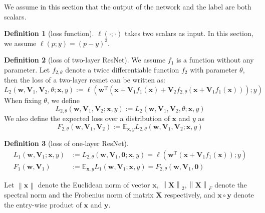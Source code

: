 \documentclass{article}
\theoremstyle{plain}
\theoremstyle{definition}
\newtheorem{defn}{Definition}
\newcommand{\norm}[1]{\left\lVert#1\right\rVert}
\begin{document}
We assume in this section that the output of the network and the label are both scalars.

\begin{defn}[loss function]
    $\ell(\cdot;\cdot)$ takes two scalars as input. In this section, we assume $\ell(p;y)=(p-y)^2$.
\end{defn}

\begin{defn}[loss of two-layer ResNet]
    We assume $f_1$ is a function without any parameter. Let $f_{2,\theta}$ denote a twice differentiable function $f_2$ with parameter $\theta$, then the loss of a two-layer resnet can be written as:
    \[L_2(\mathbf{w},\mathbf{V}_1,\mathbf{V}_2,\theta;\mathbf{x},y):=\ell\left(\mathbf{w}^\mathrm{T}(\mathbf{x}+\mathbf{V}_1f_1(\mathbf{x})+\mathbf{V}_2f_{2,\theta}(\mathbf{x}+\mathbf{V}_1f_1(\mathbf{x})));y\right)\]
    When fixing $\theta$, we define
    \[L_{2,\theta}(\mathbf{w},\mathbf{V}_1,\mathbf{V}_2;\mathbf{x},y):=L_2(\mathbf{w},\mathbf{V}_1,\mathbf{V}_2,\theta;\mathbf{x},y)\]
    We also define the expected loss over a distribution of $\mathbf{x}$ and $y$ as
    \[F_{2,\theta}(\mathbf{w},\mathbf{V}_1,\mathbf{V}_2):=\mathbb{E}_{\mathbf{x},y}L_{2,\theta}(\mathbf{w},\mathbf{V}_1,\mathbf{V}_2;\mathbf{x},y)\]
\end{defn}

\begin{defn}[loss of one-layer ResNet]
    \begin{align*}
        L_1(\mathbf{w},\mathbf{V}_1;\mathbf{x},y)&:=L_{2,\theta}(\mathbf{w},\mathbf{V}_1,\mathbf{0};\mathbf{x},y)=\ell\left(\mathbf{w}^\mathrm{T}(\mathbf{x}+\mathbf{V}_1f_1(\mathbf{x}));y\right)\\
    F_1(\mathbf{w},\mathbf{V}_1)&:=\mathbb{E}_{\mathbf{x},y}L_1(\mathbf{w},\mathbf{V}_1;\mathbf{x},y)=F_{2,\theta}(\mathbf{w},\mathbf{V}_1,\mathbf{0})
    \end{align*}
\end{defn}

\begin{flushleft}
    Let $\norm{\mathbf{x}}$ denote the Euclidean norm of vector $\mathbf{x}$, $\norm{\mathbf{X}}_2,\norm{\mathbf{X}}_F$ denote the spectral norm and the Frobenius norm of matrix $\mathbf{X}$ respectively, and $\mathbf{x}\circ\mathbf{y}$ denote the entry-wise product of $\mathbf{x}$ and $\mathbf{y}$.
\end{flushleft}
\end{document}
